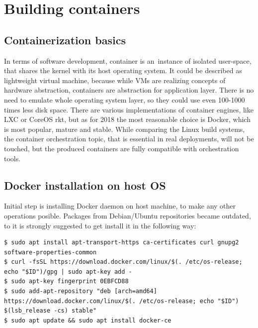 \documentclass[printmode]{mgr}
\begin{document}
\section{Building containers}


\subsection*{Containerization basics}


In terms of software development, container is an~instance of isolated user-space, that shares the kernel with its host operating system.\cite{web:what-container}
It could be described as lightweight virtual machine, because while VMs are realizing concepts of hardware abstraction, containers are abstraction for application layer.
There is no need to emulate whole operating system layer, so they could use even 100-1000 times less disk space.
There are various implementations of container engines, like LXC or CoreOS rkt, but as for 2018 the most reasonable choice is Docker, which is most popular, mature and stable.\cite{web:why-docker}
While comparing the Linux build systems, the container orchestration topic, that is essential in real deployments\cite{web:container-orchestration}, will not be touched, but the produced containers are fully compatible with orchestration tools.

\subsection*{Docker installation on host OS}

Initial step is installing Docker daemon on host machine, to make any other operations posible.
Packages from Debian/Ubuntu repositories became outdated, to it is strongly suggested to get install it in the following way:

\begin{lstlisting}
$ sudo apt install apt-transport-https ca-certificates curl gnupg2 software-properties-common
$ curl -fsSL https://download.docker.com/linux/$(. /etc/os-release; echo "$ID")/gpg | sudo apt-key add -
$ sudo apt-key fingerprint 0EBFCD88
$ sudo add-apt-repository "deb [arch=amd64] https://download.docker.com/linux/$(. /etc/os-release; echo "$ID") $(lsb_release -cs) stable"
$ sudo apt update && sudo apt install docker-ce
\end{lstlisting}
\end{document}
